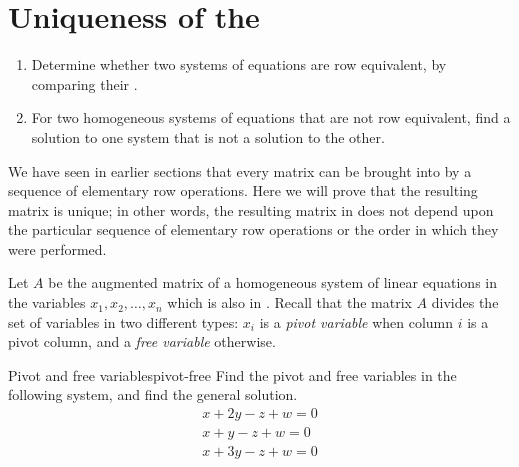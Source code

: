 \section{Uniqueness of the {\rref}}

\begin{outcome}
  \begin{enumerate}
  \item Determine whether two systems of equations are row equivalent,
    by comparing their {\rref}.
  \item For two homogeneous systems of equations that are not row
    equivalent, find a solution to one system that is not a solution
    to the other.
  \end{enumerate}
\end{outcome}

We have seen in earlier sections that every matrix can be brought into
{\rref} by a sequence of elementary row operations. Here we will prove
that the resulting matrix is unique; in other words, the resulting
matrix in {\rref} does not depend upon the particular sequence of
elementary row operations or the order in which they were performed.

Let $A$ be the augmented matrix of a homogeneous system of linear
equations in the variables $x_1, x_2,\ldots, x_n$ which is also in
{\rref}. Recall that the matrix $A$ divides the set of variables in
two different types: $x_i$ is a
{\em pivot variable} when column $i$ is a pivot
column, and a {\em free variable} otherwise.

\begin{example}{Pivot and free variables}{pivot-free}
  Find the pivot and free variables in the following system, and find
  the general solution.
  \begin{equation*}
    \begin{array}{c}
      x+2y-z+w=0 \\
      x+y-z+w=0 \\
      x+3y-z+w=0
    \end{array}
  \end{equation*}
\end{example}

